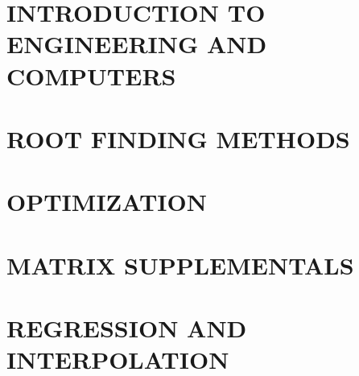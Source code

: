 \documentclass{book}
\begin{document}










%

\section{INTRODUCTION TO ENGINEERING AND COMPUTERS}







\section{ROOT FINDING METHODS}







%

%

\section{OPTIMIZATION}





\section{MATRIX SUPPLEMENTALS}





\section{REGRESSION AND INTERPOLATION}






\end{document}
